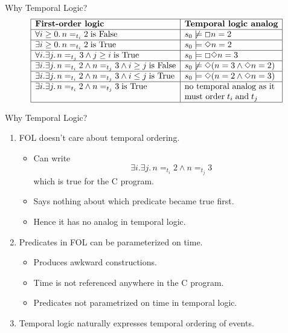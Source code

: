 \begin{wideslide}[bm=,toc=]{Why Temporal Logic?}
\begin{displaymath}
\begin{array}{|l|l|}
\hline
\mbox{\bf First-order logic} & \mbox{\bf Temporal logic analog} \\\hline
\forall i\geq 0.\, n=_{t_i}2\;\mbox{\rm is False} & s_0\not\models\Box n = 2\\\hline 
\exists i\geq 0.\, n=_{t_i}2\;\mbox{\rm is True}  & s_0\models\Diamond n = 2\\\hline
\forall i.\exists j.\, n=_{t_j}3 \wedge j\geq i\;\mbox{\rm is True} & s_0\models\Box\Diamond n = 3\\\hline
\exists i.\exists j.\, n =_{t_i}2 \wedge n=_{t_j}3 \wedge i \geq j\;\mbox{\rm is False} & 
s_0\not\models\Diamond (n = 3\wedge\Diamond n = 2)\\\hline
\exists i.\exists j.\, n =_{t_i}2 \wedge n=_{t_j}3 \wedge i \leq j\;\mbox{\rm is True} & 
s_0\models\Diamond (n = 2\wedge\Diamond n = 3)\\\hline
\exists i.\exists j.\, n =_{t_i}2 \wedge n=_{t_j}3\;\mbox{\rm is True} & 
\mbox{\rm no temporal analog as it} \\
 & \mbox{\rm must order}\;t_i\;\mbox{\rm and}\;t_j\\\hline
\end{array}
\end{displaymath}
\end{wideslide}

\begin{wideslide}[bm=,toc=]{Why Temporal Logic?}
\begin{enumerate}
\item<1-> FOL doesn't care about temporal ordering.  
\begin{itemize}
\item<2-> Can write
\begin{displaymath}
\exists i.\exists j.\, n =_{t_i}2 \wedge n=_{t_j}3
\end{displaymath}
which is true for the C program.
\item<2-> Says nothing about which predicate became true first.
\item<2-> Hence it has no analog in temporal logic.
\end{itemize}
\item<3-> Predicates in FOL can be parameterized on time.
\begin{itemize}
\item<4-> Produces awkward constructions.
\item<4-> Time is not referenced anywhere in the C program.
\item<4-> Predicates not parametrized on time in temporal logic.
\end{itemize}
\item<5-> Temporal logic naturally expresses temporal ordering of events.
\end{enumerate}
\end{wideslide}
